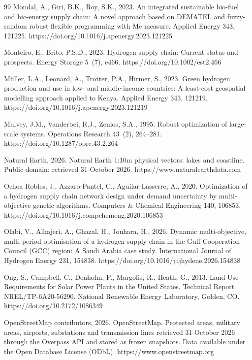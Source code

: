 \documentclass[preprint,12pt,authoryear]{elsarticle}
\begin{document}
\begin{thebibliography}{99}
Mondal, A., Giri, B.K., Roy, S.K., 2023. An integrated sustainable bio-fuel and bio-energy supply chain: A novel approach based on DEMATEL and fuzzy-random robust flexible programming with Me measure. Applied Energy 343, 121225. https://doi.org/10.1016/j.apenergy.2023.121225

Monteiro, E., Brito, P.S.D., 2023. Hydrogen supply chain: Current status and prospects. Energy Storage 5~(7), e466. https://doi.org/10.1002/est2.466

M{\"u}ller, L.A., Leonard, A., Trotter, P.A., Hirmer, S., 2023. Green hydrogen production and use in low- and middle-income countries: A least-cost geospatial modelling approach applied to Kenya. Applied Energy 343, 121219. https://doi.org/10.1016/j.apenergy.2023.121219

Mulvey, J.M., Vanderbei, R.J., Zenios, S.A., 1995. Robust optimization of large-scale systems. Operations Research 43~(2), 264--281. https://doi.org/10.1287/opre.43.2.264

Natural Earth, 2026. Natural Earth 1:10m physical vectors: lakes and coastline. Public domain; retrieved 31 October 2026. https://www.naturalearthdata.com

Ochoa Robles, J., Azzaro-Pantel, C., Aguilar-Lasserre, A., 2020. Optimization of a hydrogen supply chain network design under demand uncertainty by multi-objective genetic algorithms. Computers \& Chemical Engineering 140, 106853. https://doi.org/10.1016/j.compchemeng.2020.106853


Olabi, V., Alhajeri, A., Ghazal, H., Jouhara, H., 2026. Dynamic multi-objective, multi-period optimisation of a hydrogen supply chain in the Gulf Cooperation Council (GCC) region: A Saudi Arabia case study. International Journal of Hydrogen Energy 231, 154838. https://doi.org/10.1016/j.ijhydene.2026.154838

Ong, S., Campbell, C., Denholm, P., Margolis, R., Heath, G., 2013. Land-Use Requirements for Solar Power Plants in the United States. Technical Report NREL/TP-6A20-56290. National Renewable Energy Laboratory, Golden, CO. https://doi.org/10.2172/1086349

OpenStreetMap contributors, 2026. OpenStreetMap. Protected areas, military areas, airports, substations and transmission lines retrieved 31 October 2026 through the Overpass API and stored as frozen snapshots. Data available under the Open Database License (ODbL). https://www.openstreetmap.org


\end{thebibliography}
\end{document}

